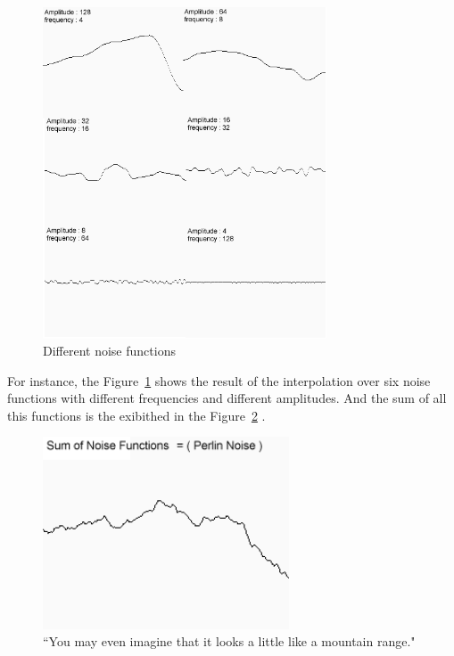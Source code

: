 \begin{figure}[htbp]
	\centering
	\includegraphics[width=0.75\textwidth]{img/Theory/Perlin_Noise/Merge.png}
	\caption{Different noise functions}
	\label{fig:merge}
\end{figure}

For instance, the Figure~\ref{fig:merge} shows the result of the interpolation over six noise functions with different frequencies and different amplitudes. And the sum of all this functions is the exibithed in the Figure~\ref{fig:noise} \cite{NoisesELIAS}.

\begin{figure}[htbp]
	\centering
	\includegraphics[width=0.65\textwidth]{img/Theory/Perlin_Noise/perlin1.png}
	\caption{``You may even imagine that it looks a little like a mountain range."}
	\label{fig:noise}
\end{figure}

